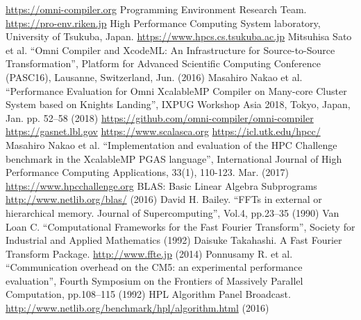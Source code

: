 \begin{thebibliography}{99.}%
%
%
 \url{https://omni-compiler.org}
%
 Programming Environment Research Team.
\url{https://pro-env.riken.jp}
%
 High Performance Computing System laboratory, University of Tsukuba, Japan.
\url{https://www.hpcs.cs.tsukuba.ac.jp}
%
 Mitsuhisa Sato et al.
  ``Omni Compiler and XcodeML: An Infrastructure for Source-to-Source Transformation'',
  Platform for Advanced Scientific Computing Conference (PASC16), Lausanne, Switzerland, Jun. (2016)
 Masahiro Nakao et al.
  ``Performance Evaluation for Omni XcalableMP Compiler on Many-core Cluster System based on Knights Landing'',
  IXPUG Workshop Asia 2018, Tokyo, Japan, Jan. pp. 52--58 (2018)
%
 \url{https://github.com/omni-compiler/omni-compiler}
%
%
 \url{https://gasnet.lbl.gov}
%
 \url{https://www.scalasca.org}
%
 \url{https://icl.utk.edu/hpcc/}
%
 Masahiro Nakao et al.
``Implementation and evaluation of the HPC Challenge benchmark in the XcalableMP PGAS language'',
  International Journal of High Performance Computing Applications, 33(1), 110-123. Mar. (2017)
%
 \url{https://www.hpcchallenge.org}%
%
 BLAS: Basic Linear Algebra Subprograms \url{http://www.netlib.org/blas/} (2016)
%
 David H. Bailey.
  ``FFTs in external or hierarchical memory. Journal of Supercomputing'',
  Vol.4, pp.23--35 (1990)
%
 Van Loan C.
  ``Computational Frameworks for the Fast Fourier Transform'',
  Society for Industrial and Applied Mathematics (1992)
%
 Daisuke Takahashi.
  A Fast Fourier Transform Package. \url{http://www.ffte.jp} (2014)
%
 Ponnusamy R. et al.
  ``Communication overhead on the CM5: an experimental performance evaluation'',
  Fourth Symposium on the Frontiers of Massively Parallel Computation, pp.108--115 (1992)
%
 HPL Algorithm Panel Broadcast. \url{http://www.netlib.org/benchmark/hpl/algorithm.html} (2016)
%

\end{thebibliography}

